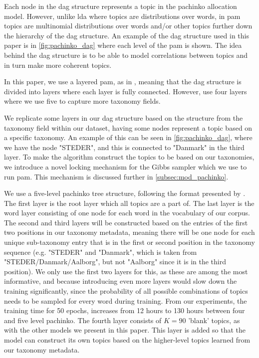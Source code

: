 Each node in the \gls{dag} structure represents a topic in the pachinko allocation model. 
However, unlike \gls{lda} where topics are distributions over words, in \gls{pam} topics are multinomial distributions over words and/or other topics further down the hierarchy of the \gls{dag} structure.
An example of the \gls{dag} structure used in this paper is in \autoref{fig:pachinko_dag} where each level of the \gls{pam} is shown.
The idea behind the \gls{dag} structure is to be able to model correlations between topics and in turn make more coherent topics.
  
In this paper, we use a layered \gls{pam}, as in \cite{li2006pachinko}, meaning that the \gls{dag} structure is divided into layers where each layer is fully connected.
However, \citet{li2006pachinko} use four layers where we use five to capture more taxonomy fields.

We replicate some layers in our \gls{dag} structure based on the structure from the taxonomy field within our dataset, having some nodes represent a topic based on a specific taxonomy.
An example of this can be seen in \autoref{fig:pachinko_dag}, where we have the node "STEDER", and this is connected to "Danmark" in the third layer.
To make the algorithm construct the topics to be based on our taxonomies, we introduce a novel locking mechanism for the Gibbs sampler which we use to run \gls{pam}.
This mechanism is discussed further in \autoref{subsec:mod_pachinko}.

We use a five-level pachinko tree structure, following the format presented by \citet{li2006pachinko}.
The first layer is the root layer which all topics are a part of.
The last layer is the word layer consisting of one node for each word in the vocabulary of our corpus.
The second and third layers will be constructed based on the entries of the first two positions in our taxonomy metadata, meaning there will be one node for each unique sub-taxonomy entry that is in the first or second position in the taxonomy sequence (e.g. "STEDER" and "Danmark", which is taken from "STEDER/Danmark/Aalborg", but not "Aalborg" since it is in the third position).
We only use the first two layers for this, as these are among the most informative, and because introducing even more layers would slow down the training significantly, since the probability of all possible combinations of topics needs to be sampled for every word during training.
From our experiments, the training time for 50 epochs, increases from 12 hours to 130 hours between four and five level pachinko.
The fourth layer consists of $K = 90$ 'blank' topics, as with the other models we present in this paper.
This layer is added so that the model can construct its own topics based on the higher-level topics learned from our taxonomy metadata.

